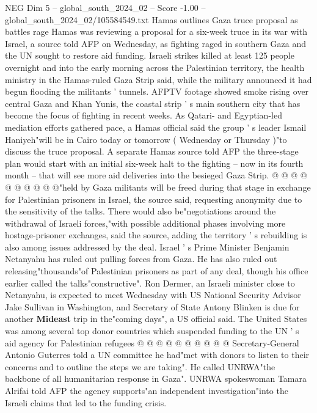 \begin{textsample}{NEG Dim 5 – global\_south\_2024\_02 – Score -1.00 – global\_south\_2024\_02/105584549.txt}  \label{ex:f5_neg_303}
Hamas outlines Gaza truce proposal as battles rage Hamas was reviewing a proposal for a six-week truce in its war with Israel, a source told AFP on Wednesday, as fighting raged in southern Gaza and the UN sought to restore aid funding.
Israeli strikes killed at least 125 people overnight and into the early morning across the Palestinian territory, the health ministry in the Hamas-ruled Gaza Strip said, while the military announced it had begun flooding the militants ' tunnels.
AFPTV footage showed smoke rising over central Gaza and Khan Yunis, the coastal strip ' s main southern city that has become the focus of fighting in recent weeks.
As Qatari- and Egyptian-led mediation efforts gathered pace, a Hamas official said the group ' s leader Ismail Haniyeh"will be in Cairo today or tomorrow ( Wednesday or Thursday )"to discuss the truce proposal.
A separate Hamas source told AFP the three-stage plan would start with an initial six-week halt to the fighting -- now in its fourth month -- that will see more aid deliveries into the besieged Gaza Strip. @ @ @ @ @ @ @ @ @ @"held by Gaza militants will be freed during that stage in exchange for Palestinian prisoners in Israel, the source said, requesting anonymity due to the sensitivity of the talks.
There would also be"negotiations around the withdrawal of Israeli forces,"with possible additional phases involving more hostage-prisoner exchanges, said the source, adding the territory ' s rebuilding is also among issues addressed by the deal.
Israel ' s Prime Minister Benjamin Netanyahu has ruled out pulling forces from Gaza.
He has also ruled out releasing"thousands"of Palestinian prisoners as part of any deal, though his office earlier called the talks"constructive".
Ron Dermer, an Israeli minister close to Netanyahu, is expected to meet Wednesday with US National Security Advisor Jake Sullivan in Washington, and Secretary of State Antony Blinken is due for another \textbf{Mideast} trip in the"coming days", a US official said.
The United States was among several top donor countries which suspended funding to the UN ' s aid agency for Palestinian refugees @ @ @ @ @ @ @ @ @ @ Secretary-General Antonio Guterres told a UN committee he had"met with donors to listen to their concerns and to outline the steps we are taking".
He called UNRWA"the backbone of all humanitarian response in Gaza".
UNRWA spokeswoman Tamara Alrifai told AFP the agency supports"an independent investigation"into the Israeli claims that led to the funding crisis.

\end{textsample}
